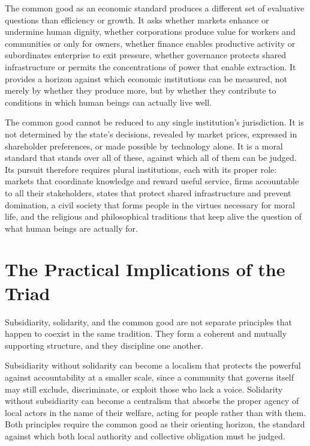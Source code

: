 \documentclass[11pt,a4paper,oneside]{book}
\begin{document}
The common good as an economic standard produces a different set of evaluative questions than efficiency or growth. It asks whether markets enhance or undermine human dignity, whether corporations produce value for workers and communities or only for owners, whether finance enables productive activity or subordinates enterprise to exit pressure, whether governance protects shared infrastructure or permits the concentrations of power that enable extraction. It provides a horizon against which economic institutions can be measured, not merely by whether they produce more, but by whether they contribute to conditions in which human beings can actually live well.

The common good cannot be reduced to any single institution's jurisdiction. It is not determined by the state's decisions, revealed by market prices, expressed in shareholder preferences, or made possible by technology alone. It is a moral standard that stands over all of these, against which all of them can be judged. Its pursuit therefore requires plural institutions, each with its proper role: markets that coordinate knowledge and reward useful service, firms accountable to all their stakeholders, states that protect shared infrastructure and prevent domination, a civil society that forms people in the virtues necessary for moral life, and the religious and philosophical traditions that keep alive the question of what human beings are actually for.

\section*{The Practical Implications of the Triad}

Subsidiarity, solidarity, and the common good are not separate principles that happen to coexist in the same tradition. They form a coherent and mutually supporting structure, and they discipline one another.

Subsidiarity without solidarity can become a localism that protects the powerful against accountability at a smaller scale, since a community that governs itself may still exclude, discriminate, or exploit those who lack a voice. Solidarity without subsidiarity can become a centralism that absorbs the proper agency of local actors in the name of their welfare, acting for people rather than with them. Both principles require the common good as their orienting horizon, the standard against which both local authority and collective obligation must be judged.
\end{document}
